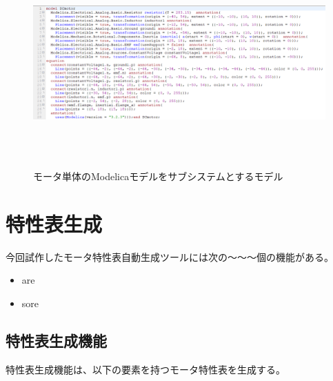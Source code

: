 \begin{figure}[t]
	\centering
	\includegraphics[width=16.5cm,height=8cm]{./Image/tantai_modelica.png}
	\caption{モータ単体のModelicaモデルをサブシステムとするモデル}
	\label{fig:subsisu_modelica}
  \end{figure}


\section{特性表生成}\label{kenkyu_mokuteki}
今回試作したモータ特性表自動生成ツールには次の～～～個の機能がある。

\begin{itemize}
	\item are
	\item sore 
\end{itemize}

\subsection{特性表生成機能}\label{sec:tokusei}
特性表生成機能は、以下の要素を持つモータ特性表を生成する。

